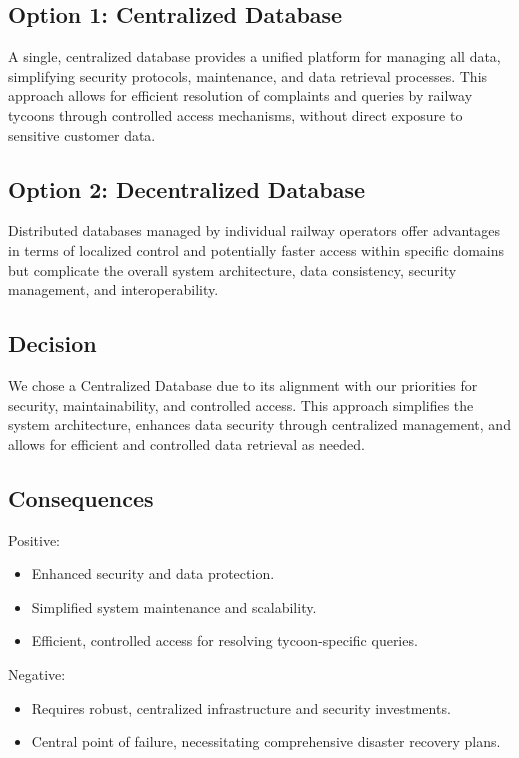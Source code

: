 \subsection*{Option 1: Centralized Database}
A single, centralized database provides a unified platform for managing all data, simplifying security protocols, maintenance, and data retrieval processes. This approach allows for efficient resolution of complaints and queries by railway tycoons through controlled access mechanisms, without direct exposure to sensitive customer data.

\subsection*{Option 2: Decentralized Database}
Distributed databases managed by individual railway operators offer advantages in terms of localized control and potentially faster access within specific domains but complicate the overall system architecture, data consistency, security management, and interoperability.

\subsection*{Decision}
We chose a Centralized Database due to its alignment with our priorities for security, maintainability, and controlled access. This approach simplifies the system architecture, enhances data security through centralized management, and allows for efficient and controlled data retrieval as needed.

\subsection*{Consequences}
Positive:
\begin{itemize}
    \item Enhanced security and data protection.
    \item Simplified system maintenance and scalability.
    \item Efficient, controlled access for resolving tycoon-specific queries.
\end{itemize}
Negative:
\begin{itemize}
    \item Requires robust, centralized infrastructure and security investments.
    \item Central point of failure, necessitating comprehensive disaster recovery plans.
\end{itemize}
